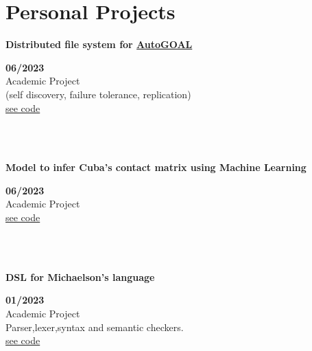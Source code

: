 \documentclass{article}
\begin{document}

\section*{Personal Projects}
\begin{minipage}{0.8\textwidth}
\parbox{0.8\linewidth}{\textbf{Distributed file system for \href{https://autogoal.github.io/}{AutoGOAL}}}\hfill \textbf{06/2023} \\
Academic Project\\
(self discovery, failure tolerance, replication)\\
\href{https://github.com/geeksLabTech/kade-drive}{see code}\\
\end{minipage} \hfill {}\\\\
\begin{minipage}{0.8\textwidth}
\parbox{0.8\linewidth}{\textbf{Model to infer Cuba's contact matrix using Machine Learning}} \hfill \textbf{06/2023}\\
Academic Project\\
\href{https://github.com/geeksLabTech/epidemic-classification-ml-project}{see code}\\
\end{minipage} \hfill {}\\\\
\begin{minipage}{0.8\textwidth}
\parbox{0.8\linewidth}{\textbf{DSL for Michaelson's language}} \hfill \textbf{01/2023}\\
Academic Project\\
Parser,lexer,syntax and semantic checkers.\\
\href{https://github.com/geeksLabTech/compilation-dsl-project}{see code}\\
\end{minipage} \hfill {}\\\\
\end{document}
